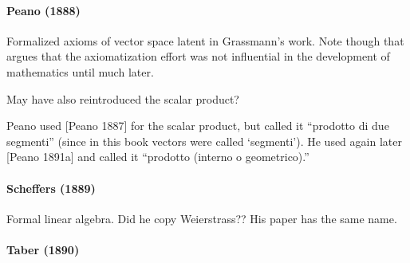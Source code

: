 \paragraph{Peano (1888)~\cite{Peano1888}}

Formalized axioms of vector space latent in Grassmann's work. Note though that \cite{Moore1995} argues that the axiomatization effort was not influential in the development of mathematics until much later.

May have also reintroduced the scalar product?

Peano used [Peano 1887]
for the scalar product, but called it “prodotto di due segmenti” (since in this book vectors
were called ‘segmenti’). He used
again later [Peano 1891a] and called it “prodotto
(interno o geometrico).”



\paragraph{Scheffers (1889)~\cite{Scheffers1889}}

Formal linear algebra. Did he copy Weierstrass?? His paper has the same name.


\paragraph{Taber (1890)~\cite{Taber1890}}

